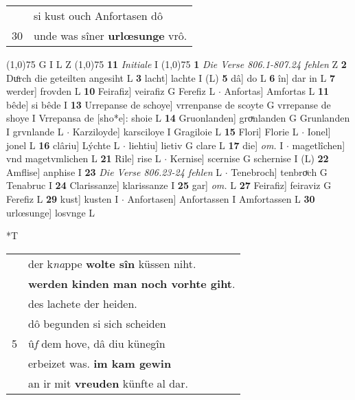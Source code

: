 \documentclass[8pt,a4paper,notitlepage]{article}
\begin{document}
\begin{table}[ht]
\begin{minipage}[t]{0.5\linewidth}
\begin{tabular}{rl}
 & si kust ouch Anfortasen dô\\ 
30 & unde was sîner \textbf{urlœsunge} vrô.\\ 
\end{tabular}
\scriptsize
\line(1,0){75} \newline
G I L Z \newline
\line(1,0){75} \newline
\textbf{11} \textit{Initiale} I  \newline
\line(1,0){75} \newline
\textbf{1} \textit{Die Verse 806.1-807.24 fehlen} Z  \textbf{2} Duͦrch die geteilten angesiht L \textbf{3} lacht] lachte I (L) \textbf{5} dâ] do L \textbf{6} în] dar in L \textbf{7} werder] frovden L \textbf{10} Feirafiz] veirafiz G Ferefiz L  $\cdot$ Anfortas] Amfortas L \textbf{11} bêde] si bêde I \textbf{13} Urrepanse de schoye] vrrenpanse de scoyte G vrrepanse de shoye I Vrrepansa de [sho*e]: shoie L \textbf{14} Gruonlanden] groͮnlanden G Grunlanden I grvnlande L  $\cdot$ Karziloyde] karsciloye I Gragiloie L \textbf{15} Flori] Florie L  $\cdot$ Ionel] jonel L \textbf{16} clâriu] Lýchte L  $\cdot$ liehtiu] lietiv G clare L \textbf{17} die] \textit{om.} I  $\cdot$ magetlîchen] vnd magetvmlichen L \textbf{21} Rile] rise L  $\cdot$ Kernise] scernise G schernise I (L) \textbf{22} Amflise] anphise I \textbf{23} \textit{Die Verse 806.23-24 fehlen} L   $\cdot$ Tenebroch] tenbroͮch G Tenabruc I \textbf{24} Clarissanze] klarissanze I \textbf{25} gar] \textit{om.} L \textbf{27} Feirafiz] feiraviz G Ferefiz L \textbf{29} kust] kusten I  $\cdot$ Anfortasen] Anfortassen I Amfortassen L \textbf{30} urlœsunge] losvnge L \newline
\end{minipage}
\hspace{0.5cm}
\begin{minipage}[t]{0.5\linewidth}
\small
\begin{center}*T
\end{center}
\begin{tabular}{rl}
 & der k\textit{na}ppe \textbf{wolte sîn} küssen niht.\\ 
 & \textbf{werden kinden man noch vorhte giht}.\\ 
 & des lachete der heiden.\\ 
 & dô begunden si sich scheiden\\ 
5 & û\textit{f} dem hove, dâ diu künegîn\\ 
 & erbeizet was. \textbf{im kam gewin}\\ 
 & an ir mit \textbf{vreuden} künfte al dar.\\ 

\end{tabular}
\end{minipage}
\end{table}
\end{document}
